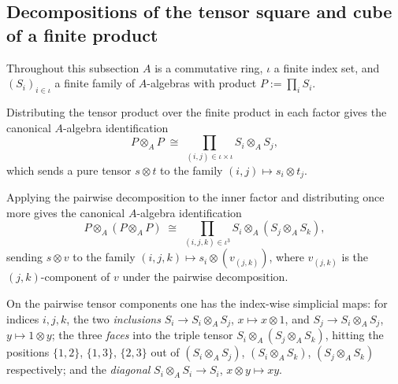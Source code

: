 \subsection{Decompositions of the tensor square and cube of a finite product}

Throughout this subsection \(A\) is a commutative ring, \(\iota\) a finite index set, and
\((S_i)_{i \in \iota}\) a finite family of \(A\)-algebras with product \(P := \prod_{i} S_i\).

\begin{definition}
  \label{def:piDoubleEquivA}
  \leanok
  Distributing the tensor product over the finite product in each factor gives the canonical
  \(A\)-algebra identification
  \[
    P \otimes_A P \;\cong\; \prod_{(i,j) \in \iota \times \iota} S_i \otimes_A S_j ,
  \]
  which sends a pure tensor \(s \otimes t\) to the family \((i,j) \mapsto s_i \otimes t_j\).
\end{definition}

\begin{definition}
  \label{def:piTripleEquivA}
  \leanok
  Applying the pairwise decomposition to the inner factor and distributing once more gives the
  canonical \(A\)-algebra identification
  \[
    P \otimes_A (P \otimes_A P) \;\cong\;
      \prod_{(i,j,k) \in \iota^3} S_i \otimes_A (S_j \otimes_A S_k) ,
  \]
  sending \(s \otimes v\) to the family \((i,j,k) \mapsto s_i \otimes (v_{(j,k)})\), where
  \(v_{(j,k)}\) is the \((j,k)\)-component of \(v\) under the pairwise decomposition.
\end{definition}

\begin{definition}
  \label{def:indexwiseMaps}
  \leanok
  On the pairwise tensor components one has the index-wise simplicial maps: for indices
  \(i, j, k\), the two \emph{inclusions} \(S_i \to S_i \otimes_A S_j\), \(x \mapsto x \otimes 1\),
  and \(S_j \to S_i \otimes_A S_j\), \(y \mapsto 1 \otimes y\); the three \emph{faces} into the
  triple tensor \(S_i \otimes_A (S_j \otimes_A S_k)\), hitting the positions \(\{1,2\}\),
  \(\{1,3\}\), \(\{2,3\}\) out of \((S_i \otimes_A S_j)\), \((S_i \otimes_A S_k)\),
  \((S_j \otimes_A S_k)\) respectively; and the \emph{diagonal}
  \(S_i \otimes_A S_i \to S_i\), \(x \otimes y \mapsto xy\).
\end{definition}

